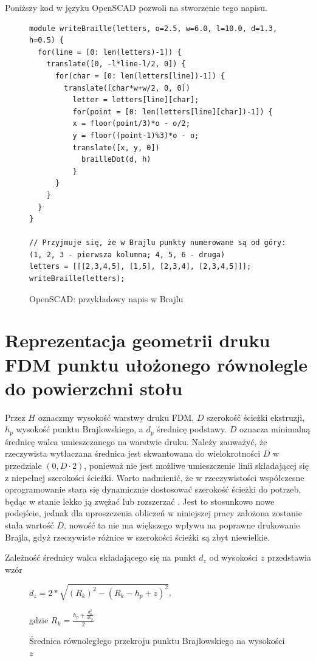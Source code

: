 \documentclass[12pt,a4paper]{article}
\begin{document}
Poniższy kod w języku OpenSCAD pozwoli na stworzenie tego napisu.

\begin{figure}
\begin{verbatim}
module writeBraille(letters, o=2.5, w=6.0, l=10.0, d=1.3, h=0.5) {
  for(line = [0: len(letters)-1]) {
    translate([0, -l*line-l/2, 0]) {
      for(char = [0: len(letters[line])-1]) {
        translate([char*w+w/2, 0, 0])
          letter = letters[line][char];
          for(point = [0: len(letters[line][char])-1]) {
          x = floor(point/3)*o - o/2;
          y = floor((point-1)%3)*o - o;
          translate([x, y, 0])
            brailleDot(d, h)
          }
      }
    }
  }
}

// Przyjmuje się, że w Brajlu punkty numerowane są od góry: (1, 2, 3 - pierwsza kolumna; 4, 5, 6 - druga)
letters = [[[2,3,4,5], [1,5], [2,3,4], [2,3,4,5]]];
writeBraille(letters);
\end{verbatim}
\caption{OpenSCAD: przykładowy napis w Brajlu}
\end{figure}

\section{Reprezentacja geometrii druku FDM punktu ułożonego równolegle do powierzchni stołu}

Przez $H$ oznaczmy wysokość warstwy druku FDM, $D$ szerokość ścieżki ekstruzji, $h_p$ wysokość punktu Brajlowskiego, a $d_p$ średnicę podstawy.
$D$ oznacza minimalną średnicę walca umieszczanego na warstwie druku. Należy zauważyć, że rzeczywista wytłaczana średnica jest skwantowana do wielokrotności $D$ w przedziale $(0, D \cdot 2)$, ponieważ nie jest możliwe umieszczenie linii składającej się z niepełnej szerokości ścieżki.
Warto nadmienić, że w rzeczywistości współczesne oprogramowanie stara się dynamicznie dostosować szerokość ścieżki do potrzeb, będąc w stanie lekko ją zwężać lub rozszerzać \cite{arachne}. Jest to stosunkowo nowe podejście, jednak dla uproszczenia obliczeń w niniejszej pracy założona zostanie stała wartość $D$, nowość ta nie ma większego wpływu na poprawne drukowanie Brajla, gdyż rzeczywiste różnice w szerokości ścieżki są zbyt niewielkie.

Zależność średnicy walca składającego się na punkt $d_z$ od wysokości $z$ przedstawia wzór

\begin{figure}
$d_z = 2 * \sqrt{(R_k)^2 - (R_k - h_p + z)^2}$,

gdzie $R_k = \frac{h_p + \frac{d_p^2}{4h_p}}{2}$
\caption{Średnica równoległego przekroju punktu Brajlowskiego na wysokości $z$}
\end{figure}
\end{document}
